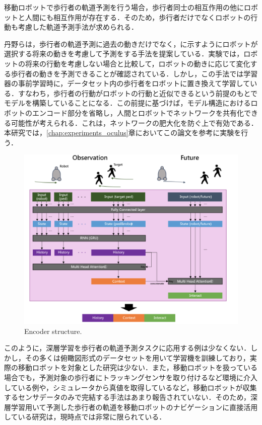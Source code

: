 \protect{}

\newpage

移動ロボットで歩行者の軌道予測を行う場合，歩行者同士の相互作用の他にロボットと人間にも相互作用が存在する．そのため，歩行者だけでなくロボットの行動も考慮した軌道予測手法が求められる．

丹野ら\cite{si2023-tanno}は，歩行者の軌道予測に過去の動きだけでなく，に示すようにロボットが選択する将来の動きを考慮して予測をする手法を提案している．実験では，ロボットの将来の行動を考慮しない場合と比較して，ロボットの動きに応じて変化する歩行者の動きを予測できることが確認されている．しかし，この手法では学習器の事前学習時に，データセット内の歩行者をロボットに置き換えて学習している．すなわち，歩行者の行動がロボットの行動と近似できるという前提のもとでモデルを構築していることになる．この前提に基づけば，モデル構造におけるロボットのエンコード部分を省略し，人間とロボットでネットワークを共有化できる可能性が考えられる．これは，ネットワークの肥大化を防ぐ上で有効である．
本研究では，\ref{chap:experiments_oculus}章においてこの論文\cite{si2023-tanno}を参考に実験を行う．
\begin{figure}[hbtp]
     \centering
    \includegraphics[keepaspectratio, scale=0.64]
         {images/future-robot.png}
    \caption{Encoder structure.\protect\footnotemark[5]}
    \label{Fig:future-robot}
\end{figure}
\protect{}

このように，深層学習を歩行者の軌道予測タスクに応用する例は少なくない．しかし，その多くは俯瞰図形式のデータセットを用いて学習機を訓練しており，実際の移動ロボットを対象とした研究は少ない．また，移動ロボットを扱っている場合でも，予測対象の歩行者にトラッキングセンサを取り付けるなど環境に介入している例や，シミュレータから真値を取得しているなど，移動ロボットが収集するセンサデータのみで完結する手法はあまり報告されていない．そのため，深層学習用いて予測した歩行者の軌道を移動ロボットのナビゲーションに直接活用している研究は，現時点では非常に限られている．

\newpage